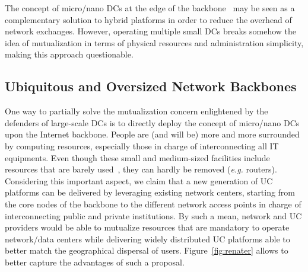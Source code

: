The concept of micro/nano DCs at the edge of the backbone~\cite{greenberg:sigcomm09} may
be seen as a complementary solution to hybrid platforms in order to reduce the overhead of
network exchanges. However, operating multiple small DCs breaks somehow the idea of
mutualization in terms of physical resources and administration simplicity, making this
approach questionable.

\subsection{Ubiquitous and Oversized Network Backbones}

One way to partially solve the mutualization concern enlightened by the defenders of
large-scale DCs is to directly deploy the concept of micro/nano DCs upon the Internet
backbone. People are (and will be) more and more surrounded by computing resources,
especially those in charge of interconnecting all IT equipments. Even though these small
and medium-sized facilities include resources that are barely
used~\cite{Andrew:2003,Benson:2010}, they can hardly be removed (\textit{e.g.} routers).
Considering this important aspect, we claim that a new generation of UC platforms can be
delivered by leveraging existing network centers, starting from the core nodes of the
backbone to the different network access points in charge of interconnecting public and
private institutions. By such a mean, network and UC providers would be able to mutualize
resources that are mandatory to operate network/data centers while delivering widely
distributed UC platforms able to better match the geographical dispersal of users.
%
%
Figure~\ref{fig:renater} allows to better capture the advantages of such a proposal.
